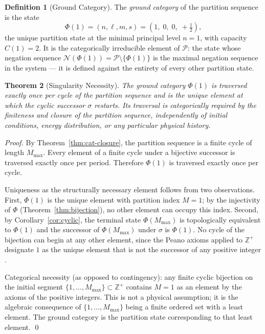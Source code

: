 \documentclass[twocolumn,10pt,a4paper]{article}
\theoremstyle{thmstyle}
\newtheorem{theorem}{Theorem}[section]
\theoremstyle{definition}
\newtheorem{definition}[theorem]{Definition}
\theoremstyle{remark}
\newcommand{\Zp}{\mathbb{Z}^{+}}
\newcommand{\Parts}{\mathcal{P}}
\newcommand{\Mmax}{M_{\max}}
\newcommand{\PhiMap}{\varPhi}
\begin{document}
\begin{definition}[Ground Category]
\label{def:ground-cat}
The \emph{ground category} of the partition sequence is the state
\begin{equation}
    \PhiMap(1) = (n, \ell, m, s) = \left(1,\; 0,\; 0,\; +\tfrac{1}{2}\right),
\end{equation}
the unique partition state at the minimal principal level $n = 1$, with capacity $C(1) = 2$. It is the categorically irreducible element of $\Parts$: the state whose negation sequence $\mathcal{N}(\PhiMap(1)) = \Parts \setminus \{\PhiMap(1)\}$ is the maximal negation sequence in the system --- it is defined against the entirety of every other partition state.
\end{definition}

\begin{theorem}[Singularity Necessity]
\label{thm:sing-necessity}
The ground category $\PhiMap(1)$ is traversed exactly once per cycle of the partition sequence and is the unique element at which the cyclic successor $\sigma$ restarts. Its traversal is categorically required by the finiteness and closure of the partition sequence, independently of initial conditions, energy distribution, or any particular physical history.
\end{theorem}

\begin{proof}
By Theorem~\ref{thm:cat-closure}, the partition sequence is a finite cycle of length $\Mmax$. Every element of a finite cycle under a bijective successor is traversed exactly once per period. Therefore $\PhiMap(1)$ is traversed exactly once per cycle.

Uniqueness as the structurally necessary element follows from two observations. First, $\PhiMap(1)$ is the unique element with partition index $M = 1$; by the injectivity of $\PhiMap$ (Theorem~\ref{thm:bijection}), no other element can occupy this index. Second, by Corollary~\ref{cor:cyclic}, the terminal state $\PhiMap(\Mmax)$ is topologically equivalent to $\PhiMap(1)$ and the successor of $\PhiMap(\Mmax)$ under $\sigma$ is $\PhiMap(1)$. No cycle of the bijection can begin at any other element, since the Peano axioms applied to $\Zp$ designate $1$ as the unique element that is not the successor of any positive integer \citep{peano1889,dedekind1888}.

Categorical necessity (as opposed to contingency): any finite cyclic bijection on the initial segment $\{1, \ldots, \Mmax\} \subset \Zp$ contains $M = 1$ as an element by the axioms of the positive integers. This is not a physical assumption; it is the algebraic consequence of $\{1, \ldots, \Mmax\}$ being a finite ordered set with a least element. The ground category is the partition state corresponding to that least element. \qed
\end{proof}
\end{document}
